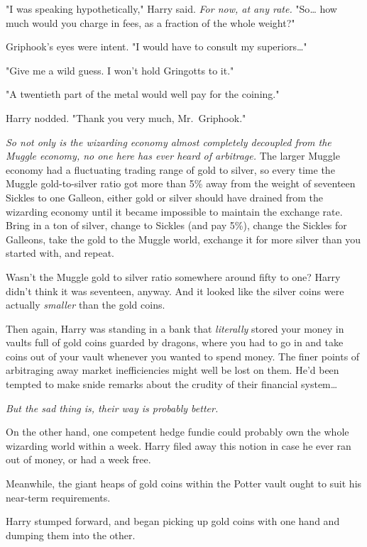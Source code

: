 "I was speaking hypothetically," Harry said. \emph{For now, at any rate.}
"So{\ldots} how much would you charge in fees, as a fraction of the whole
weight?"

Griphook's eyes were intent. "I would have to consult my superiors{\ldots}"

"Give me a wild guess. I won't hold Gringotts to it."

"A twentieth part of the metal would well pay for the coining."

Harry nodded. "Thank you very much, Mr.~Griphook."

\emph{So not only is the wizarding economy almost completely decoupled from the
Muggle economy, no one here has ever heard of arbitrage.} The larger Muggle
economy had a fluctuating trading range of gold to silver, so every time the
Muggle gold-to-silver ratio got more than 5\% away from the weight of seventeen
Sickles to one Galleon, either gold or silver should have drained from the
wizarding economy until it became impossible to maintain the exchange rate.
Bring in a ton of silver, change to Sickles (and pay 5\%), change the Sickles
for Galleons, take the gold to the Muggle world, exchange it for more silver
than you started with, and repeat.

Wasn't the Muggle gold to silver ratio somewhere around fifty to one? Harry
didn't think it was seventeen, anyway. And it looked like the silver coins were
actually \emph{smaller} than the gold coins.

Then again, Harry was standing in a bank that \emph{literally} stored your
money in vaults full of gold coins guarded by dragons, where you had to go in
and take coins out of your vault whenever you wanted to spend money. The finer
points of arbitraging away market inefficiencies might well be lost on them.
He'd been tempted to make snide remarks about the crudity of their financial
system{\ldots}

\emph{But the sad thing is, their way is probably better.}

On the other hand, one competent hedge fundie could probably own the whole
wizarding world within a week. Harry filed away this notion in case he ever ran
out of money, or had a week free.

Meanwhile, the giant heaps of gold coins within the Potter vault ought to suit
his near-term requirements.

Harry stumped forward, and began picking up gold coins with one hand and
dumping them into the other.

